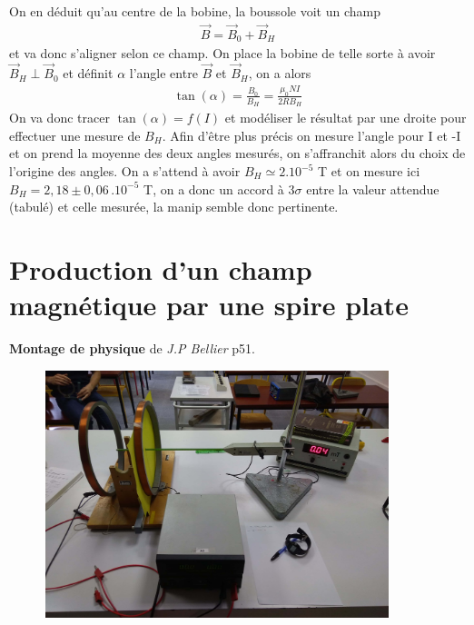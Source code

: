 \documentclass[12pt,prb,aps,epsf]{article}
\begin{document}
On en déduit qu'au centre de la bobine, la boussole voit un champ 
\begin{eqnarray}
\vec{B} = \vec{B}_0 + \vec{B}_H
\end{eqnarray}
et va donc s'aligner selon ce champ. On place la bobine de telle sorte à avoir $\vec{B}_H\perp \vec{B}_0$ et  définit $\alpha$ l'angle entre $\vec{B}$ et $\vec{B}_H$, on a alors
\begin{eqnarray}
\tan(\alpha) = \frac{B_0}{B_H} = \frac{\mu_0NI}{2RB_H}
\end{eqnarray} 
On va donc tracer $\tan(\alpha) = f(I)$ et modéliser le résultat par une droite pour effectuer une mesure de $B_H$. Afin d'être plus précis on mesure l'angle pour I et -I et on prend la moyenne des deux angles mesurés, on s'affranchit alors du choix de l'origine des angles. On a s'attend à avoir $B_H \simeq 2.10^{-5}$ T et on mesure ici $B_H =2,18\pm0,06\, .10^{-5}$ T, on a donc un accord à $3\sigma$ entre la valeur attendue (tabulé) et celle mesurée, la manip semble donc pertinente.

\section{Production d'un champ magnétique par une spire plate}
\textbf{Montage de physique} de \textit{J.P Bellier} p51.\\

\begin{figure}[h]
	\centering \includegraphics[width=10cm]{bobine_plate}
\end{figure}
\end{document}
